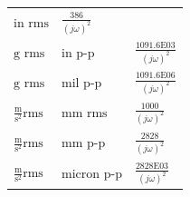 \documentclass[
]{book}
\begin{document}
\begin{longtable}[]{@{}lll@{}}
\begin{minipage}[t]{0.11\columnwidth}
\(\text{in rms}\)\strut
\end{minipage} & \begin{minipage}[t]{0.36\columnwidth}\raggedright
\(\frac{386}{ \left( j\omega \right)^2}\)\strut
\end{minipage}\tabularnewline
\begin{minipage}[t]{0.44\columnwidth}\raggedright
\(\text{g rms}\)\strut
\end{minipage} & \begin{minipage}[t]{0.11\columnwidth}\raggedright
\(\text{in p-p}\)\strut
\end{minipage} & \begin{minipage}[t]{0.36\columnwidth}\raggedright
\(\frac{1091.6\mathrm{E}03}{ \left( j\omega \right)^2}\)\strut
\end{minipage}\tabularnewline
\begin{minipage}[t]{0.44\columnwidth}\raggedright
\(\text{g rms}\)\strut
\end{minipage} & \begin{minipage}[t]{0.11\columnwidth}\raggedright
\(\text{mil p-p}\)\strut
\end{minipage} & \begin{minipage}[t]{0.36\columnwidth}\raggedright
\(\frac{1091.6\mathrm{E}06}{ \left( j\omega \right)^2}\)\strut
\end{minipage}\tabularnewline
\begin{minipage}[t]{0.44\columnwidth}\raggedright
\(\frac{\text{m}}{\text{s}^2} \text{rms}\)\strut
\end{minipage} & \begin{minipage}[t]{0.11\columnwidth}\raggedright
\(\text{mm rms}\)\strut
\end{minipage} & \begin{minipage}[t]{0.36\columnwidth}\raggedright
\(\frac{1000}{ \left( j\omega \right)^2}\)\strut
\end{minipage}\tabularnewline
\begin{minipage}[t]{0.44\columnwidth}\raggedright
\(\frac{\text{m}}{\text{s}^2} \text{rms}\)\strut
\end{minipage} & \begin{minipage}[t]{0.11\columnwidth}\raggedright
\(\text{mm p-p}\)\strut
\end{minipage} & \begin{minipage}[t]{0.36\columnwidth}\raggedright
\(\frac{2828}{ \left( j\omega \right)^2}\)\strut
\end{minipage}\tabularnewline
\begin{minipage}[t]{0.44\columnwidth}\raggedright
\(\frac{\text{m}}{\text{s}^2} \text{rms}\)\strut
\end{minipage} & \begin{minipage}[t]{0.11\columnwidth}\raggedright
\(\text{micron p-p}\)\strut
\end{minipage} & \begin{minipage}[t]{0.36\columnwidth}\raggedright
\(\frac{2828\mathrm{E}03}{ \left( j\omega \right)^2}\)\strut
\end{minipage}\tabularnewline
\bottomrule
\end{longtable}
\end{document}
